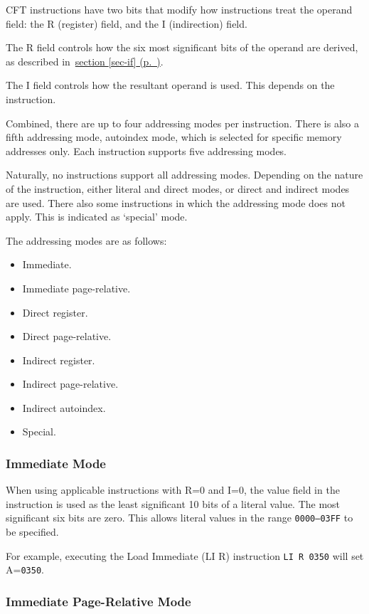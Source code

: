 \documentclass[11pt,a4paper,twocolumns]{article}
\newcommand{\cf}[2][section]{\hyperref[#2]{#1 \ref*{#2} (p.~\pageref*{#2})}}
\newcommand\register[1]{\textsf{#1}}
\newcommand\A{\register{A}}
\begin{document}
CFT instructions have two bits that modify how instructions treat the
operand field: the R (register) field, and the I (indirection)
field.

The R field controls how the six most significant bits of the operand
are derived, as described in~\cf{sec-if}.

The I field controls how the resultant operand is used. This depends
on the instruction.

Combined, there are up to four addressing modes per instruction. There
is also a fifth addressing mode, autoindex mode, which is selected for
specific memory addresses only. Each instruction supports five
addressing modes. 

Naturally, no instructions support all addressing modes. Depending on
the nature of the instruction, either literal and direct modes, or
direct and indirect modes are used. There also some instructions in
which the addressing mode does not apply. This is indicated as
‘special’ mode.

The addressing modes are as follows:

\begin{itemize}
  \item Immediate.
  \item Immediate page-relative.
  \item Direct register.
  \item Direct page-relative.
  \item Indirect register.
  \item Indirect page-relative.
  \item Indirect autoindex.
  \item Special.
\end{itemize}

\subsubsection{Immediate Mode}

When using applicable instructions with R=0 and I=0, the value field
in the instruction is used as the least significant 10 bits of a
literal value. The most significant six bits are zero. This allows
literal values in the range {\tt 0000–03FF} to be specified.

For example, executing the Load Immediate (LI R) instruction {\tt LI R
  0350} will set \A={\tt 0350}.

\subsubsection{Immediate Page-Relative Mode}
\end{document}

